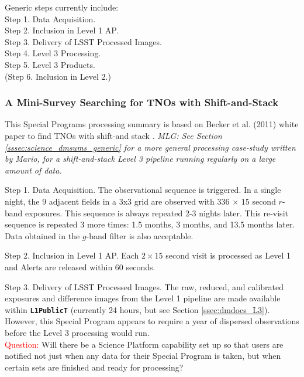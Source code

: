 \documentclass[DM,lsstdraft,toc]{lsstdoc}
\begin{document}
Generic steps currently include: \\
Step 1. Data Acquisition. \\
Step 2. Inclusion in Level 1 AP. \\
Step 3. Delivery of LSST Processed Images. \\
Step 4. Level 3 Processing. \\
Step 5. Level 3 Products. \\
(Step 6. Inclusion in Level 2.) \\

\subsubsection{A Mini-Survey Searching for TNOs with Shift-and-Stack}

This Special Programs processing summary is based on Becker et al. (2011) white paper to find TNOs with shift-and stack \citep{BeckerWP}. {\it MLG: See Section \ref{sssec:science_dmsums_generic} for a more general processing case-study written by Mario, for a shift-and-stack Level 3 pipeline running regularly on a large amount of data.}

Step 1. Data Acquisition. The observational sequence is triggered. In a single night, the 9 adjacent fields in a 3x3 grid are observed with $336$ $\times$ $15$ second $r$-band exposures. This sequence is always repeated 2-3 nights later. This re-visit sequence is repeated 3 more times: 1.5 months, 3 months, and 13.5 months later. Data obtained in the $g$-band filter is also acceptable. \citep{BeckerWP}

Step 2. Inclusion in Level 1 AP. Each $2\times15$ second visit is processed as Level 1 and Alerts are released within 60 seconds.

Step 3. Delivery of LSST Processed Images. The raw, reduced, and calibrated exposures and difference images from the Level 1 pipeline are made available within {\tt \textbf{L1PublicT}} (currently 24 hours, but see Section \ref{ssec:dmdocs_L3}). However, this Special Program appears to require a year of dispersed observations before the Level 3 processing would run. \\
\textcolor{red}{Question:} Will there be a Science Platform capability set up so that users are notified not just when any data for their Special Program is taken, but when certain sets are finished and ready for processing?
\end{document}
